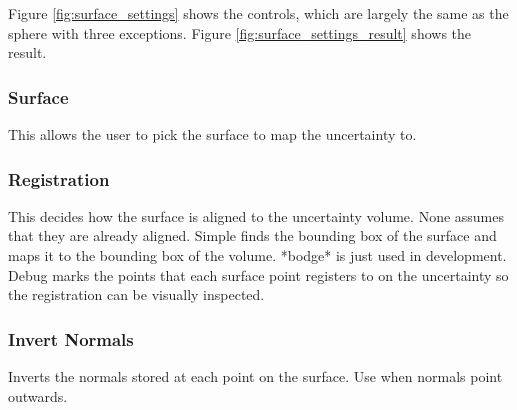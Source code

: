 Figure \ref{fig:surface_settings} shows the controls, which are largely the same as the sphere with three exceptions. Figure \ref{fig:surface_settings_result} shows the result.

\subsubsection{Surface}
This allows the user to pick the surface to map the uncertainty to.

\subsubsection{Registration}
This decides how the surface is aligned to the uncertainty volume. None assumes that they are already aligned. Simple finds the bounding box of the surface and maps it to the bounding box of the volume. *bodge* is just used in development. Debug marks the points that each surface point registers to on the uncertainty so the registration can be visually inspected.

\subsubsection{Invert Normals}
Inverts the normals stored at each point on the surface. Use when normals point outwards.

